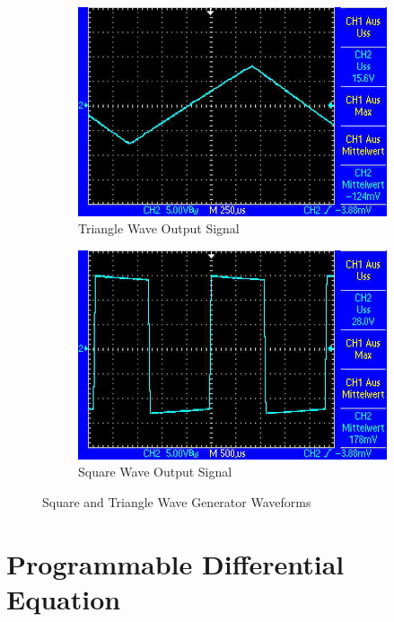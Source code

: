 \begin{figure}
	\centering
	\begin{subfigure}{0.4\textwidth}
		\centering
		\includegraphics[width=.9\linewidth]{./img/ss-wavegen-triag}
		\caption{Triangle Wave Output Signal}
	\end{subfigure}
	\begin{subfigure}{0.4\textwidth}
		\centering
		\includegraphics[width=.9\linewidth]{./img/ss-wavegen-squ}
		\caption{Square Wave Output Signal}
	\end{subfigure}
	\caption{Square and Triangle Wave Generator Waveforms}
	\label{ss:wavegen}
\end{figure}

\section{Programmable Differential Equation}
